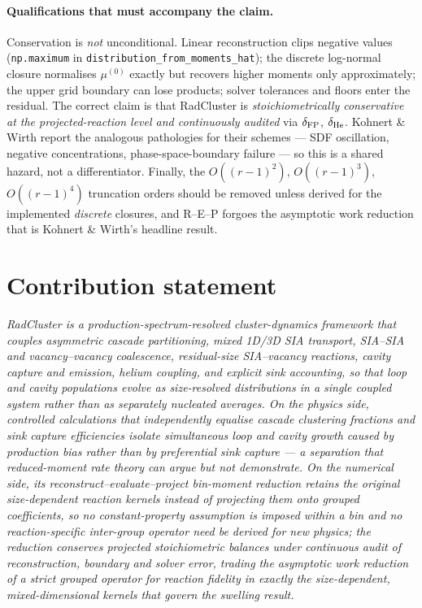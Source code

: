 \documentclass[11pt,a4paper]{article}
\newcommand{\code}[1]{\texttt{\small #1}}
\newcommand{\flag}[1]{\textcolor{red!70!black}{#1}}
\begin{document}
\paragraph{\flag{Qualifications that must accompany the claim.}}
Conservation is \emph{not} unconditional. Linear reconstruction clips negative
values (\code{np.maximum} in \code{distribution\_from\_moments\_hat}); the discrete
log-normal closure normalises $\mu^{(0)}$ exactly but recovers higher moments only
approximately; the upper grid boundary can lose products; solver tolerances and
floors enter the residual. The correct claim is that RadCluster is
\emph{stoichiometrically conservative at the projected-reaction level and
continuously audited} via $\delta_{\rm FP}$, $\delta_{\rm He}$. Kohnert \& Wirth
report the analogous pathologies for their schemes --- SDF oscillation, negative
concentrations, phase-space-boundary failure --- so this is a shared hazard, not a
differentiator. Finally, the $O((r{-}1)^2)$, $O((r{-}1)^3)$, $O((r{-}1)^4)$
truncation orders should be removed unless derived for the implemented
\emph{discrete} closures, and R--E--P forgoes the asymptotic work reduction that is
Kohnert \& Wirth's headline result.

\section*{Contribution statement}

\emph{\small
RadCluster is a production-spectrum-resolved cluster-dynamics framework that
couples asymmetric cascade partitioning, mixed 1D/3D SIA transport, SIA--SIA and
vacancy--vacancy coalescence, residual-size SIA--vacancy reactions, cavity capture
and emission, helium coupling, and explicit sink accounting, so that loop and
cavity populations evolve as size-resolved distributions in a single coupled
system rather than as separately nucleated averages. On the physics side,
controlled calculations that independently equalise cascade clustering fractions
and sink capture efficiencies isolate simultaneous loop and cavity growth caused
by production bias rather than by preferential sink capture --- a separation that
reduced-moment rate theory can argue but not demonstrate. On the numerical side,
its reconstruct--evaluate--project bin-moment reduction retains the original
size-dependent reaction kernels instead of projecting them onto grouped
coefficients, so no constant-property assumption is imposed within a bin and no
reaction-specific inter-group operator need be derived for new physics; the
reduction conserves projected stoichiometric balances under continuous audit of
reconstruction, boundary and solver error, trading the asymptotic work reduction
of a strict grouped operator for reaction fidelity in exactly the size-dependent,
mixed-dimensional kernels that govern the swelling result.}
\end{document}
